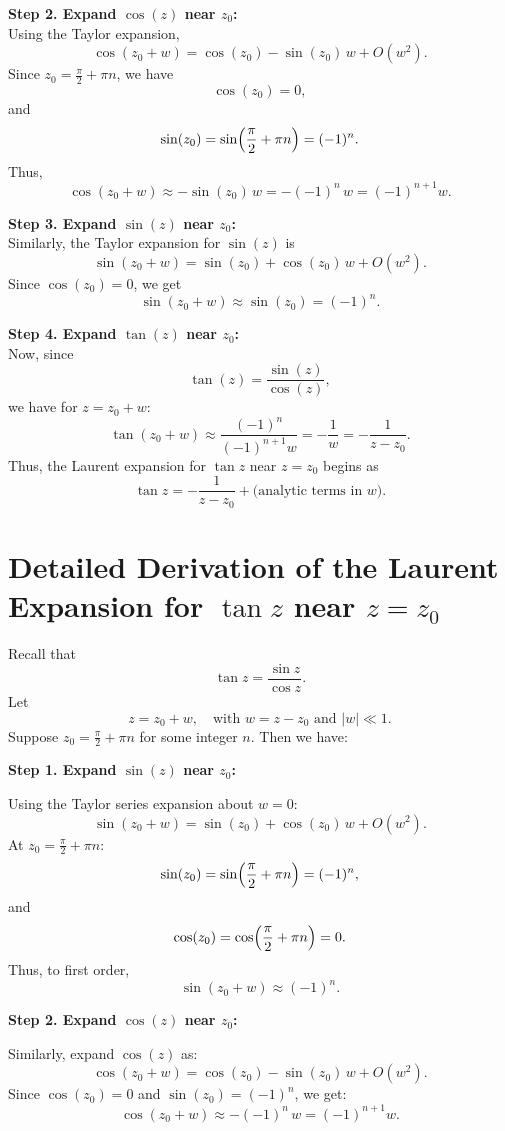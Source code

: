 \documentclass[12pt]{article}
\theoremstyle{definition} %
\theoremstyle{plain} %
\begin{document}
\bigskip

\textbf{Step 2. Expand \(\cos(z)\) near \(z_0\):}\\[1mm]
Using the Taylor expansion,
\[
\cos(z_0+w) = \cos(z_0) - \sin(z_0)\,w + O(w^2).
\]
Since \(z_0=\frac{\pi}{2}+\pi n\), we have
\[
\cos(z_0)=0,
\]
and 
\[
\sin(z_0)=\sin\Bigl(\frac{\pi}{2}+\pi n\Bigr)=(-1)^n.
\]
Thus,
\[
\cos(z_0+w) \approx -\sin(z_0)\,w = -(-1)^n\,w = (-1)^{n+1}w.
\]

\bigskip

\textbf{Step 3. Expand \(\sin(z)\) near \(z_0\):}\\[1mm]
Similarly, the Taylor expansion for \(\sin(z)\) is
\[
\sin(z_0+w) = \sin(z_0) + \cos(z_0)\,w + O(w^2).
\]
Since \(\cos(z_0)=0\), we get
\[
\sin(z_0+w) \approx \sin(z_0)=(-1)^n.
\]

\bigskip

\textbf{Step 4. Expand \(\tan(z)\) near \(z_0\):}\\[1mm]
Now, since
\[
\tan(z)=\frac{\sin(z)}{\cos(z)},
\]
we have for \(z=z_0+w\):
\[
\tan(z_0+w) \approx \frac{(-1)^n}{(-1)^{n+1}w} = -\frac{1}{w} = -\frac{1}{z-z_0}.
\]
Thus, the Laurent expansion for \(\tan z\) near \(z=z_0\) begins as
\[
\tan z = -\frac{1}{z-z_0} + \text{(analytic terms in }w\text{)}.
\]

\section*{Detailed Derivation of the Laurent Expansion for \(\tan z\) near \(z=z_0\)}

Recall that
\[
\tan z = \frac{\sin z}{\cos z}.
\]
Let
\[
z = z_0 + w, \quad \text{with } w = z - z_0 \text{ and } |w|\ll 1.
\]
Suppose \(z_0 = \frac{\pi}{2}+\pi n\) for some integer \(n\). Then we have:

\medskip
\textbf{Step 1. Expand \(\sin(z)\) near \(z_0\):}

Using the Taylor series expansion about \(w=0\):
\[
\sin(z_0+w) = \sin(z_0) + \cos(z_0)\,w + O(w^2).
\]
At \(z_0 = \frac{\pi}{2}+\pi n\):
\[
\sin(z_0) = \sin\Bigl(\frac{\pi}{2}+\pi n\Bigr) = (-1)^n,
\]
and
\[
\cos(z_0) = \cos\Bigl(\frac{\pi}{2}+\pi n\Bigr) = 0.
\]
Thus, to first order,
\[
\sin(z_0+w) \approx (-1)^n.
\]

\medskip
\textbf{Step 2. Expand \(\cos(z)\) near \(z_0\):}

Similarly, expand \(\cos(z)\) as:
\[
\cos(z_0+w) = \cos(z_0) - \sin(z_0)\,w + O(w^2).
\]
Since \(\cos(z_0)=0\) and \(\sin(z_0)=(-1)^n\), we get:
\[
\cos(z_0+w) \approx -(-1)^n\,w = (-1)^{n+1}w.
\]
\end{document}
